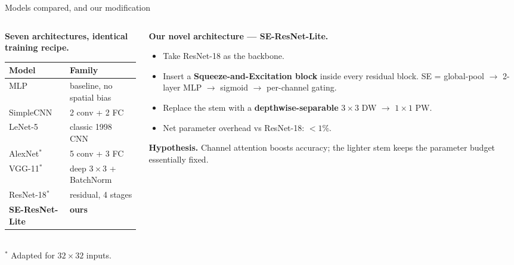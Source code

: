 \documentclass[10pt,aspectratio=169]{beamer}
\begin{document}
\begin{frame}{Models compared, and our modification}
\begin{columns}[T,onlytextwidth]
\begin{column}{0.46\linewidth}
\textbf{Seven architectures, identical training recipe.}
\vspace{4pt}\\
\begin{tabular}{ll}
\toprule
\textbf{Model} & \textbf{Family} \\
\midrule
MLP             & baseline, no spatial bias \\
SimpleCNN       & 2 conv + 2 FC \\
LeNet-5         & classic 1998 CNN \\
AlexNet$^*$     & 5 conv + 3 FC \\
VGG-11$^*$      & deep $3{\times}3$ + BatchNorm \\
ResNet-18$^*$   & residual, 4 stages \\
\textbf{SE-ResNet-Lite} & \textbf{ours} \\
\bottomrule
\end{tabular}\\[3pt]
\small $^*$ Adapted for $32{\times}32$ inputs.
\end{column}
\begin{column}{0.5\linewidth}
\textbf{Our novel architecture --- SE-ResNet-Lite.}
\begin{itemize}\small
  \item Take ResNet-18 as the backbone.
  \item Insert a \textbf{Squeeze-and-Excitation block} inside every
    residual block. SE = global-pool \(\to\) 2-layer MLP \(\to\)
    sigmoid \(\to\) per-channel gating.
  \item Replace the stem with a \textbf{depthwise-separable}
    $3{\times}3$ DW \(\to\) $1{\times}1$ PW.
  \item Net parameter overhead vs ResNet-18: \textbf{$<\!1\%$}.
\end{itemize}
\vspace{3pt}\small
\textbf{Hypothesis.} Channel attention boosts accuracy; the lighter
stem keeps the parameter budget essentially fixed.
\end{column}
\end{columns}
\end{frame}
\end{document}
